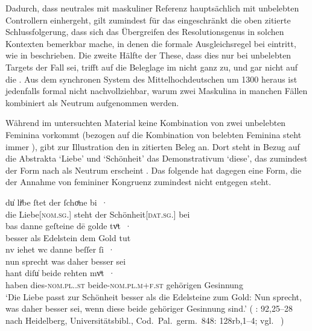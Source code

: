 Dadurch, dass neutrales  mit maskuliner Referenz hauptsächlich mit
unbelebten Controllern einhergeht, gilt zumindest
für das \CAO{} eingeschränkt die oben zitierte Schlussfolgerung, dass sich das
Übergreifen des Resolutionsgenus in solchen Kontexten
bemerkbar mache, in denen die formale Ausgleichsregel bei 
eintritt, wie in  beschrieben. Die zweite Hälfte der These,
dass dies nur bei unbelebten Targets der Fall sei,
trifft auf die Beleglage im \CAO{} nicht ganz zu, und gar nicht auf die \KC{}.
Aus dem synchronen System des Mittelhochdeutschen um 1300
heraus ist jedenfalls formal nicht nachvollziehbar, warum zwei
Maskulina in manchen Fällen kombiniert als Neutrum aufgenommen werden.

Während im untersuchten Material keine Kombination von zwei
unbelebten Feminina vorkommt (bezogen auf die Kombination von
belebten Feminina steht immer ), gibt
\citet[384]{paul2007} zur Illustration den in 
zitierten Beleg an. Dort steht in Bezug auf die Abstrakta  `Liebe'
und  `Schönheit' das Demonstrativum
 `diese', das zumindest der Form nach als Neutrum erscheint
\autocite[485]{ksw2}. Das folgende  hat dagegen eine Form, die der
Annahme von femininer Kongruenz zumindest nicht entgegen steht.

\begin{exe}
\ex\label{ex:walther92_25-28_C_2}
	\gll du̍ liͤbe ſtet der ſchoͤne bi~· \\
			die Liebe[\textsc{nom.sg.\FemI}] steht der
			Schönheit[\textsc{dat.sg.\FemI}] bei \\
\sn \gll bas danne geſteine dē golde tvͦt~· \\
		besser als Edelstein dem Gold tut \\
\sn \gll nv iehet wc danne beſſer ſi~· \\
		nun sprecht was daher besser sei \\
\sn \gll hant diſu̍ beide rehten mvͦt~· \\
		haben dies-\textsc{nom.pl.\NeutI.st} beide-\textsc{nom.pl.m+f\subI.st}
			gehörigen Gesinnung \\
	\trans `Die Liebe passt zur Schönheit besser als die Edelsteine zum
		Gold: Nun sprecht, was daher besser sei, wenn diese beide gehöriger
		Gesinnung sind.'
		(%
			: 92,25--28 nach
			Heidelberg, Universitätsbibl., Cod.~Pal.~germ.~848: 128rb,1--4;
			vgl.~\cite[356--358]{bein2013}%
		)
	\\
\end{exe}

